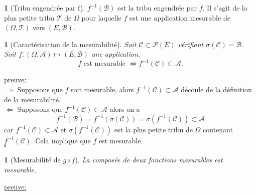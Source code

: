 \documentclass[8pt,notheorems]{beamer}
\def \Om{\Omega}
\newtheorem{corollary}{\translate{Corollaire}}
\newtheorem{prop}{\translate{Proposition}}
\theoremstyle{definition}
\newtheorem{definition}{\translate{Definition}}
\theoremstyle{example}
\theoremstyle{mystyle}
\theoremstyle{plain}
\begin{document}
\begin{frame}[allowframebreaks]
\begin{definition}[Tribu engendrée par f]
$f^{-1}(\mathcal{B})$ est la tribu engendrée par $f$. Il s'agit de la plus petite tribu $\mathcal{T}$ de $\Omega$ pour laquelle $f$ est une application mesurable de $(\Omega,\mathcal{T})$ vers $(E, \mathcal{B})$.
\end{definition}
\begin{corollary}[Caractérisation de la mesurabilité]\label{cor:CaracMesurabilite}
Soit $\mathcal{C}\subset \mathcal{P}(E)$ vérifiant $\sigma(\mathcal{C})=\mathcal{B}$. Soit $f:(\Omega,\mathcal{A})\mapsto (E,\mathcal{B})$ une application. 
$$
f\text{ est mesurable } \Leftrightarrow f^{-1}(\mathcal{C})\subset\mathcal{A}.
$$
\end{corollary}
\underline{preuve:}\\
$\Rightarrow$ Supposons que $f$ soit mesurable, alors $f^{-1}(\mathcal{C})\subset\mathcal{A}$ découle de la définition de la mesurabilité. \\
$\Leftarrow$ Supposons que  $f^{-1}(\mathcal{C})\subset\mathcal{A}$ alors on a
$$
f^{-1}(\mathcal{B})=f^{-1}(\sigma(\mathcal{C}))=\sigma(f^{-1}(\mathcal{C}))\subset\mathcal{A}
$$
car $f^{-1}(\mathcal{C})\subset \mathcal{A}$ et $\sigma(f^{-1}(\mathcal{C}))$ est la plus petite tribu de $\Om$ contenant $f^{-1}(\mathcal{C})$. Cela implique que $f$ est mesurable. \\
 $\square$\\
\begin{prop}[Mesurabilité de $g\circ f$]\label{prop:composee_fonctions_mesurable}
La composée de deux fonctions mesurables est mesurable.
\end{prop}
\underline{preuve:}\\


\end{frame}
\end{document}
